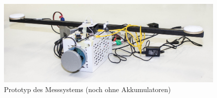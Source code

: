 \documentclass[a4paper,12pt,bibliography=totoc, listof=totoc,titlepage,pointlessnumbers]{scrreprt}
\begin{document}
\begin{figure}[!ht]
 \centering
 \includegraphics[width=1\textwidth]{img/system.jpg}
 \caption{Prototyp des Messsystems (noch ohne Akkumulatoren)}
 \label{abb:system}
\end{figure}


\renewcommand\UrlFont\itshape

\listoffigures
\listoftables
\end{document}
